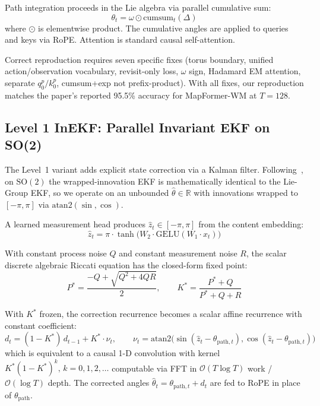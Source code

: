 Path integration proceeds in the Lie algebra via parallel cumulative sum:
\begin{equation}
  \theta_t = \omega \odot \mathrm{cumsum}_t(\Delta)
\end{equation}
where $\odot$ is elementwise product. The cumulative angles are applied to
queries and keys via RoPE. Attention is standard causal self-attention.

Correct reproduction requires seven specific fixes (torus boundary,
unified action/observation vocabulary, revisit-only loss, $\omega$ sign,
Hadamard EM attention, separate $q_0^p/k_0^p$, cumsum+exp not
prefix-product). With all fixes, our reproduction matches the paper's
reported 95.5\% accuracy for MapFormer-WM at $T{=}128$.

\subsection{Level 1 InEKF: Parallel Invariant EKF on SO(2)}

The Level~1 variant adds explicit state correction via a Kalman filter.
Following~\citet{markovic2017wrapping}, on $\mathrm{SO}(2)$ the
wrapped-innovation EKF is mathematically identical to the Lie-Group EKF,
so we operate on an unbounded $\hat\theta \in \mathbb{R}$ with
innovations wrapped to $[-\pi, \pi]$ via $\mathrm{atan2}(\sin, \cos)$.

A learned measurement head produces $\hat z_t \in [-\pi, \pi]$ from the
content embedding:
\begin{equation}
  \hat z_t = \pi \cdot \tanh\bigl( W_2 \cdot \mathrm{GELU}(W_1 \cdot x_t) \bigr)
\end{equation}

With constant process noise $Q$ and constant measurement noise $R$, the
scalar discrete algebraic Riccati equation has the closed-form fixed
point:
\begin{equation}
  P^* = \frac{-Q + \sqrt{Q^2 + 4QR}}{2}, \qquad K^* = \frac{P^* + Q}{P^* + Q + R}
\end{equation}

With $K^*$ frozen, the correction recurrence becomes a scalar affine
recurrence with constant coefficient:
\begin{equation}
  d_t = (1 - K^*) \, d_{t-1} + K^* \cdot \nu_t,
  \qquad
  \nu_t = \mathrm{atan2}\bigl( \sin(\hat z_t - \theta_{\mathrm{path},t}), \cos(\hat z_t - \theta_{\mathrm{path},t}) \bigr)
\end{equation}
which is equivalent to a causal 1-D convolution with kernel
$K^* (1 - K^*)^k,\, k = 0, 1, 2, \ldots$ computable via FFT in
$\mathcal{O}(T \log T)$ work / $\mathcal{O}(\log T)$ depth. The corrected
angles $\hat\theta_t = \theta_{\mathrm{path},t} + d_t$ are fed to RoPE in
place of $\theta_\mathrm{path}$.

